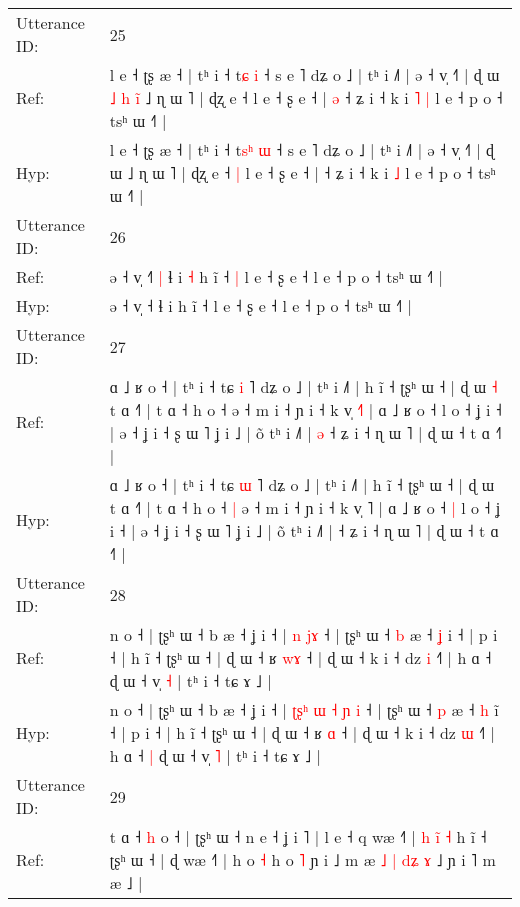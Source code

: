 \documentclass[10pt]{article}
\DeclareRobustCommand{\hl}[1]{{\textcolor{red}{#1}}}
\begin{document}
\begin{longtable}{ll}
\midrule
Utterance ID: & 25 \\
Ref: & l e ˧ ʈʂ æ ˧ | tʰ i ˧ t\hl{}\hl{ɕ} \hl{i} ˧ s e ˥ dʑ o ˩ | tʰ i ˩˥ | ə ˧ v̩ ˧˥ | ɖ ɯ\hl{ }\hl{˩}\hl{ }\hl{h}\hl{ }\hl{i}\hl{̃} ˩ ɳ ɯ ˥ | ɖʐ e ˧\hl{}\hl{} l e ˧ ʂ e ˧ |\hl{ }\hl{ə} ˧ ʑ i ˧ k i\hl{ }\hl{˥} \hl{|} l e ˧ p o ˧ tsʰ ɯ ˧˥ |
 \\
Hyp: & l e ˧ ʈʂ æ ˧ | tʰ i ˧ t\hl{s}\hl{ʰ} \hl{ɯ} ˧ s e ˥ dʑ o ˩ | tʰ i ˩˥ | ə ˧ v̩ ˧˥ | ɖ ɯ\hl{}\hl{}\hl{}\hl{}\hl{}\hl{}\hl{} ˩ ɳ ɯ ˥ | ɖʐ e ˧\hl{ }\hl{|} l e ˧ ʂ e ˧ |\hl{}\hl{} ˧ ʑ i ˧ k i\hl{}\hl{} \hl{˩} l e ˧ p o ˧ tsʰ ɯ ˧˥ |
 \\
\midrule
Utterance ID: & 26 \\
Ref: & ə ˧ v̩ ˧\hl{˥}\hl{ }\hl{|} ɬ i\hl{ }\hl{˧} h ĩ ˧\hl{ }\hl{|} l e ˧ ʂ e ˧ l e ˧ p o ˧ tsʰ ɯ ˧˥ |
 \\
Hyp: & ə ˧ v̩ ˧\hl{}\hl{}\hl{} ɬ i\hl{}\hl{} h ĩ ˧\hl{}\hl{} l e ˧ ʂ e ˧ l e ˧ p o ˧ tsʰ ɯ ˧˥ |
 \\
\midrule
Utterance ID: & 27 \\
Ref: & ɑ ˩ ʁ o ˧ | tʰ i ˧ tɕ \hl{i} ˥ dʑ o ˩ | tʰ i ˩˥ | h ĩ ˧ ʈʂʰ ɯ ˧ | ɖ ɯ\hl{ }\hl{˧} t ɑ ˧˥ | t ɑ ˧ h o ˧\hl{}\hl{} ə ˧ m i ˧ ɲ i ˧ k v̩ \hl{˧}˥ | ɑ ˩ ʁ o ˧\hl{}\hl{} l o ˧ ʝ i ˧ | ə ˧ ʝ i ˧ ʂ ɯ ˥ ʝ i ˩ | õ tʰ i ˩˥ |\hl{ }\hl{ə} ˧ ʑ i ˧ ɳ ɯ ˥ | ɖ ɯ ˧ t ɑ ˧˥ |
 \\
Hyp: & ɑ ˩ ʁ o ˧ | tʰ i ˧ tɕ \hl{ɯ} ˥ dʑ o ˩ | tʰ i ˩˥ | h ĩ ˧ ʈʂʰ ɯ ˧ | ɖ ɯ\hl{}\hl{} t ɑ ˧˥ | t ɑ ˧ h o ˧\hl{ }\hl{|} ə ˧ m i ˧ ɲ i ˧ k v̩ \hl{}˥ | ɑ ˩ ʁ o ˧\hl{ }\hl{|} l o ˧ ʝ i ˧ | ə ˧ ʝ i ˧ ʂ ɯ ˥ ʝ i ˩ | õ tʰ i ˩˥ |\hl{}\hl{} ˧ ʑ i ˧ ɳ ɯ ˥ | ɖ ɯ ˧ t ɑ ˧˥ |
 \\
\midrule
Utterance ID: & 28 \\
Ref: & n o ˧ | ʈʂʰ ɯ ˧ b æ ˧ ʝ i ˧ |\hl{}\hl{}\hl{}\hl{}\hl{}\hl{} \hl{n} \hl{}\hl{j}\hl{ɤ} ˧ | ʈʂʰ ɯ ˧ \hl{b} æ ˧ \hl{ʝ} i\hl{} ˧ | p i ˧ | h ĩ ˧ ʈʂʰ ɯ ˧ | ɖ ɯ ˧ ʁ \hl{w}\hl{ɤ} ˧ | ɖ ɯ ˧ k i ˧ dz \hl{i} ˧˥ | h ɑ ˧\hl{}\hl{} ɖ ɯ ˧ v̩ \hl{˧} | tʰ i ˧ tɕ ɤ ˩ |
 \\
Hyp: & n o ˧ | ʈʂʰ ɯ ˧ b æ ˧ ʝ i ˧ |\hl{ }\hl{ʈ}\hl{ʂ}\hl{ʰ}\hl{ }\hl{ɯ} \hl{˧} \hl{ɲ}\hl{ }\hl{i} ˧ | ʈʂʰ ɯ ˧ \hl{p} æ ˧ \hl{h} i\hl{̃} ˧ | p i ˧ | h ĩ ˧ ʈʂʰ ɯ ˧ | ɖ ɯ ˧ ʁ \hl{}\hl{ɑ} ˧ | ɖ ɯ ˧ k i ˧ dz \hl{ɯ} ˧˥ | h ɑ ˧\hl{ }\hl{|} ɖ ɯ ˧ v̩ \hl{˥} | tʰ i ˧ tɕ ɤ ˩ |
 \\
\midrule
Utterance ID: & 29 \\
Ref: & t ɑ ˧ \hl{h} o ˧ | ʈʂʰ ɯ ˧ n e ˧ ʝ i ˥ | l e ˧ q wæ ˧\hl{˥} | \hl{h} \hl{i}\hl{̃} \hl{˧} h ĩ ˧ ʈʂʰ ɯ ˧ | ɖ wæ ˧˥ | h o \hl{˧} h o \hl{˥} ɲ i ˩ m æ \hl{}\hl{˩} \hl{|} \hl{}\hl{d}\hl{ʑ} \hl{}\hl{ɤ} ˩ ɲ i ˥ m æ ˩ |

\end{longtable}
\end{document}
